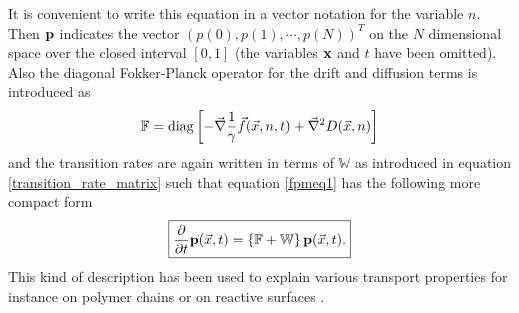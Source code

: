 It is convenient to write this equation in a vector notation for the variable $n$. Then $\boldsymbol{\mathbf{p}}$ indicates the vector $(p(0),p(1),\cdots,p(N))^{T}$ on the $N$ dimensional space over the closed interval $[0,1]$ (the variables $\boldsymbol{\mathbf{x}}$ and $t$ have been omitted). \\ 
Also the diagonal Fokker-Planck operator for the drift and diffusion terms is introduced as
\begin{equation}
    \mathbb{F} = {\rm diag} \left[- \vec{ \nabla } \frac{1}{\gamma}\vec{f}(\vec{x},n,t) + \vec{\nabla}^{2} D(\vec{x},n) \right]
    \label{fpo}
\end{equation}
and the transition rates are again written in terms of $\mathbb{W}$ as introduced in equation \eqref{transition_rate_matrix} such that equation \eqref{fpmeq1} has the following more compact form
\begin{equation}
    \boxed{\frac{\partial}{\partial t} \boldsymbol{\mathbf{p}}(\vec{x},t) = \left\{ \mathbb{F} + \mathbb{W} \right\} \boldsymbol{\mathbf{p}}(\vec{x},t).}
    \label{fpmeq2}
\end{equation}
This kind of description has been used to explain various transport properties for instance on polymer chains or on reactive surfaces \cite{Friedman1968,Caceres1990}.
